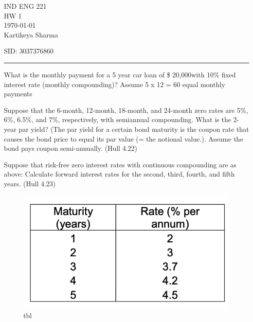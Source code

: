 \documentclass[12pt,letterpaper, onecolumn]{exam}
\begin{document}
\begingroup  
    \centering
    \LARGE IND ENG 221\\
    \LARGE HW 1\\[0.5em]
    \large \today\\[0.5em]
    \large Kartikeya Sharma\par
    \large SID: 3037376860\par
\endgroup
\rule{\textwidth}{0.4pt}
\pointsdroppedatright   %
\printanswers
\renewcommand{\solutiontitle}{\noindent\textbf{Ans:}\enspace}   %

\begin{questions}

    \question What is the monthly payment for a 5 year car loan of \$ 20,000with 10\% fixed interest rate (monthly compounding)? Assume 5 x 12 = 60 equal monthly payments
    
    \begin{solution}
        
    \end{solution}
    
    \question Suppose that the 6-month, 12-month, 18-month, and 24-month zero rates are 5\%, 6\%, 6.5\%, and 7\%, respectively, with semiannual compounding. What is the 2-year par yield? (The par yield for a certain bond maturity is the coupon rate that causes the bond price to equal its par value (= the notional value.). Assume the bond pays coupon semi-annually. (Hull 4.22)

    \begin{solution}
            
    \end{solution}

    \pagebreak %
    
    \question Suppose that risk-free zero interest rates with continuous compounding are as above:
    Calculate forward interest rates for the second, third, fourth, and fifth years. (Hull 4.23)
    
    \begin{figure}
        \centering
        \includegraphics[width=.5\linewidth]{tbl.png}
        \caption{tbl}
        \label{fig:enter-label}
    \end{figure}


\end{questions}
\end{document}
